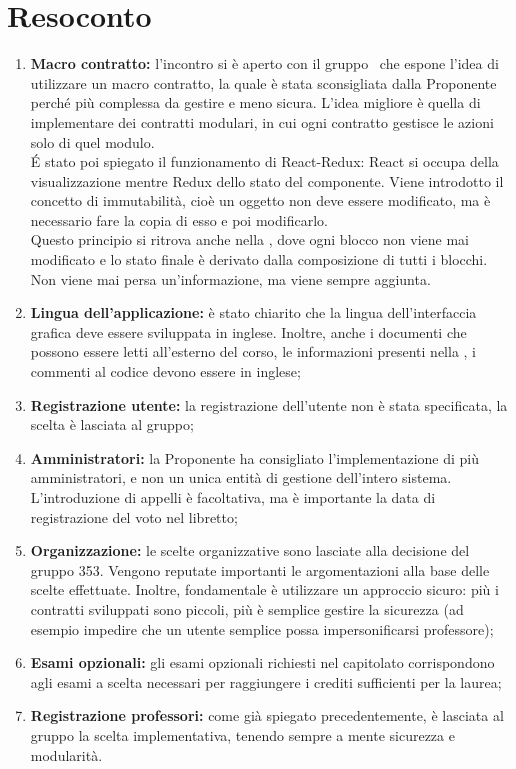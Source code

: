 \documentclass[VER-2017-12-08.tex]{subfiles}
\begin{document}
\chapter{Resoconto}
\begin{enumerate}
	\item \textbf{Macro contratto:} l'incontro si è aperto con il gruppo \gruppo\ che espone l'idea di utilizzare un macro contratto, la quale è stata sconsigliata dalla Proponente perché più complessa da gestire e meno sicura. L'idea migliore è quella di implementare dei contratti modulari, in cui ogni contratto gestisce le azioni solo di quel modulo.\\
	\'{E} stato poi spiegato il funzionamento di React-Redux: React si occupa della visualizzazione mentre Redux dello stato del componente. Viene introdotto il concetto di immutabilità, cioè un oggetto non deve essere modificato, ma è necessario fare la copia di esso e poi modificarlo.\\
	Questo principio si ritrova anche nella , dove ogni blocco non viene mai modificato e lo stato finale è derivato dalla composizione di tutti i blocchi. Non viene mai persa un'informazione, ma viene sempre aggiunta.
	
	\item \textbf{Lingua dell'applicazione:} è stato chiarito che la lingua dell'interfaccia grafica deve essere sviluppata in inglese. Inoltre, anche i documenti che possono essere letti all'esterno del corso, le informazioni presenti nella  , i commenti al codice devono essere in inglese;
	
	\item \textbf{Registrazione utente:} la registrazione dell'utente non è stata specificata, la scelta è lasciata al gruppo;
	
	\item \textbf{Amministratori:} la Proponente ha consigliato l'implementazione di più amministratori, e non un unica entità di gestione dell'intero sistema. L'introduzione di appelli è facoltativa, ma è importante la data di registrazione del voto nel libretto;
	
	\item \textbf{Organizzazione:} le scelte organizzative sono lasciate alla decisione del gruppo 353. Vengono reputate importanti le argomentazioni alla base delle scelte effettuate. Inoltre, fondamentale è utilizzare un approccio sicuro: più i contratti sviluppati sono piccoli, più è semplice gestire la sicurezza (ad esempio impedire che un utente semplice possa impersonificarsi professore);
	
	\item \textbf{Esami opzionali:} gli esami opzionali richiesti nel capitolato corrispondono agli esami a scelta necessari per raggiungere i crediti sufficienti per la laurea;
	
	\item \textbf{Registrazione professori:} come già spiegato precedentemente, è lasciata al gruppo la scelta implementativa, tenendo sempre a mente sicurezza e modularità.
\end{enumerate}
\end{document}

